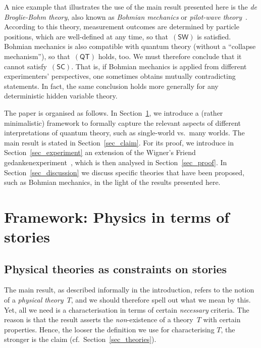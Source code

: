 \documentclass{article}
\theoremstyle{plain}
\theoremstyle{definition}
\newcommand*{\QT}{\mathsf{(QT)}}
\newcommand*{\SW}{\mathsf{(SW)}}
\newcommand*{\SelfCons}{\mathsf{(SC)}}
\begin{document}
A nice example that illustrates the use of the main result presented here is the \emph{de Broglie-Bohm theory}, also known as \emph{Bohmian mechanics} or \emph{pilot-wave theory}~\cite{deBroglie27,Bohm52,DuTe09}. According to this theory, measurement outcomes are determined by particle positions, which are well-defined at any time, so that~$\SW$ is satisfied. Bohmian mechanics is also compatible with quantum theory (without a ``collapse mechanism''), so that~$\QT$ holds, too. We must therefore conclude that it cannot satisfy~$\SelfCons$. That is, if Bohmian mechanics is applied from different experimenters' perspectives, one sometimes obtains mutually contradicting statements. In fact, the same conclusion holds more generally for any deterministic hidden variable theory. 

The paper is organised as follows.  In Section~\ref{sec_framework}, we introduce a (rather minimalistic) framework to formally capture the relevant aspects of different interpretations of quantum theory, such as single-world vs.\ many worlds. The main result is stated  in Section~\ref{sec_claim}. For its proof, we introduce in Section~\ref{sec_experiment} an extension of the Wigner's Friend gedankenexperiment~\cite{Wigner67}, which is then analysed in Section~\ref{sec_proof}. In Section~\ref{sec_discussion} we discuss specific theories that have been proposed, such as Bohmian mechanics, in the light of the results presented here. 


\section{Framework: Physics in terms of stories} \label{sec_framework}

\subsection{Physical theories as constraints on stories} \label{sec_phystheory}

The main result, as described informally in the introduction, refers to the notion of a \emph{physical theory}~$T$, and we should therefore spell out what we mean by this. Yet, all we need is a characterisation in terms of certain \emph{necessary} criteria. The reason is that the result asserts the \emph{non}-existence of a theory~$T$ with certain properties. Hence, the looser the definition we use for characterising $T$, the stronger is the claim (cf.\ Section~\ref{sec_theories}).
\end{document}
